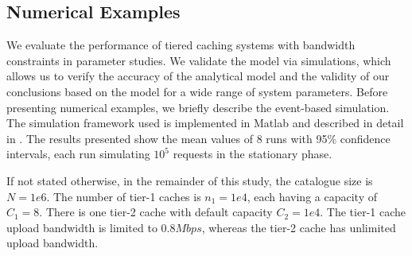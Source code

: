 \subsection{Numerical Examples}\label{sec:hierarchical:analyticbw:results}

We evaluate the performance of tiered caching systems with bandwidth constraints in parameter studies.
We validate the model via simulations, which allows us to verify the accuracy of the analytical model and the validity of our conclusions based on the model for a wide range of system parameters.
Before presenting numerical examples, we briefly describe the event-based simulation.
The simulation framework used is implemented in Matlab and described in detail in \cite{info3-inproceedings-2015-530}. The results presented show the mean values of 8 runs with 95\% confidence intervals, each run simulating $10^5$ requests in the stationary phase.

If not stated otherwise, in the remainder of this study, the catalogue size is $N=1e6$.
The number of tier-1 caches is $n_1=1e4$, each having a capacity of $C_1=8$.
There is one tier-2 cache with default capacity $C_2=1e4$.
The tier-1 cache upload bandwidth is limited to $0.8Mbps$, whereas the tier-2 cache has unlimited upload bandwidth.


